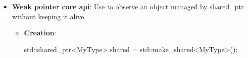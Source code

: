 \documentclass{report}
\begin{document}
\begin{itemize}
\begin{itemize}
\begin{itemize}
                        \item \textbf{std::shared\_ptr<T>} does not include the deleter in its template parameters; you pass the deleter to the constructor instead
                            \bigbreak \noindent 
                            std::shared\_ptr already uses a heap-allocated control block for reference counts, so storing a type-erased deleter inside that control block adds no extra pointer overhead per smart pointer instance
                    \end{itemize}
            \end{itemize}
        \item \textbf{Weak pointer core api}: Use to observe an object managed by shared\_ptr without keeping it alive.
            \begin{itemize}
                \item \textbf{Creation}: 
                    \bigbreak \noindent 
                    \begin{cppcode}
                        std::shared_ptr<MyType> shared =
                        std::make_shared<MyType>();


\end{cppcode}
\end{itemize}
\end{itemize}
\end{document}
